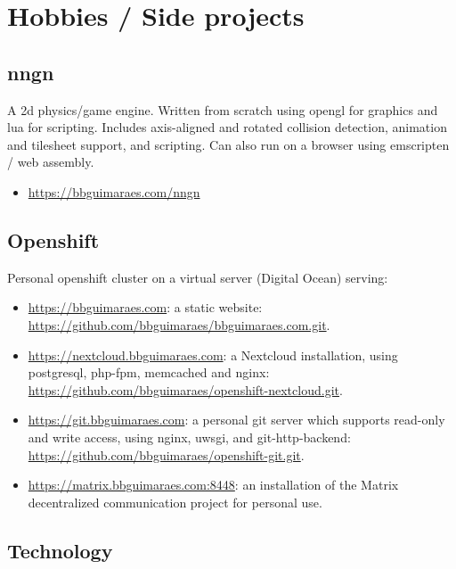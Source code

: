 \section*{Hobbies / Side projects}
\subsection*{nngn}

A 2d physics/game engine.  Written from scratch using opengl for graphics and
lua for scripting.  Includes axis-aligned and rotated collision detection,
animation and tilesheet support, and scripting.  Can also run on a browser
using emscripten / web assembly.

\begin{itemize}
    \item \url{https://bbguimaraes.com/nngn}
\end{itemize}

\subsection*{Openshift}

Personal openshift cluster on a virtual server (Digital Ocean) serving:

\begin{itemize}
    \item
        \url{https://bbguimaraes.com}: a static website:
        \url{https://github.com/bbguimaraes/bbguimaraes.com.git}.
    \item
        \url{https://nextcloud.bbguimaraes.com}: a Nextcloud installation,
        using postgresql, php-fpm, memcached and nginx:
        \url{https://github.com/bbguimaraes/openshift-nextcloud.git}.
    \item
        \url{https://git.bbguimaraes.com}: a personal git server which supports
        read-only and write access, using nginx, uwsgi, and git-http-backend:
        \url{https://github.com/bbguimaraes/openshift-git.git}.
    \item
        \url{https://matrix.bbguimaraes.com:8448}: an installation of the
        Matrix decentralized communication project for personal use.
\end{itemize}

\subsection*{Technology}

